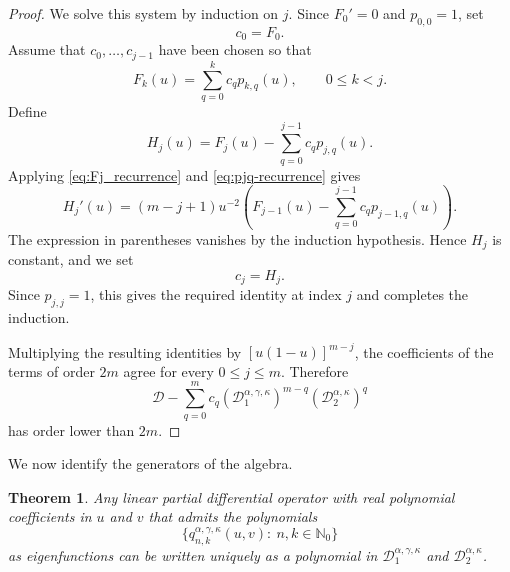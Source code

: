 \documentclass[reqno,10pt]{amsart}
\theoremstyle{plain}
\newtheorem{theorem}{Theorem}[section]
\numberwithin{equation}{section}
\numberwithin{figure}{section}
\begin{document}
\begin{proof}
We solve this system by induction on \(j\). Since \(F_0'=0\) and
\(p_{0,0}=1\), set
\[
c_0=F_0.
\]
Assume that \(c_0,\ldots,c_{j-1}\) have been chosen so that
\[
F_k(u)
=
\sum_{q=0}^{k}c_qp_{k,q}(u),
\qquad 0\le k<j.
\]
Define
\[
H_j(u)
=
F_j(u)
-
\sum_{q=0}^{j-1}c_qp_{j,q}(u).
\]
Applying \eqref{eq:Fj_recurrence} and \eqref{eq:pjq-recurrence} gives
\[
H_j'(u)
=
(m-j+1)u^{-2}
\left(
F_{j-1}(u)
-
\sum_{q=0}^{j-1}c_qp_{j-1,q}(u)
\right).
\]
The expression in parentheses vanishes by the induction hypothesis.
Hence \(H_j\) is constant, and we set
\[
c_j=H_j.
\]
Since \(p_{j,j}=1\), this gives the required identity at index \(j\) and
completes the induction.

Multiplying the resulting identities by \([u(1-u)]^{m-j}\), the
coefficients of the terms of order \(2m\) agree for every
\(0\leq j\leq m\). Therefore
\[
\mathcal D
-
\sum_{q=0}^{m}
c_q
\left(\mathcal D_1^{\alpha,\gamma,\kappa}\right)^{m-q}
\left(\mathcal D_2^{\alpha,\kappa}\right)^q
\]
has order lower than \(2m\).
\end{proof}


We now identify the generators of the algebra.

\begin{theorem}\label{thm:algebra_agk}
Any linear partial differential operator with real polynomial coefficients in
$u$ and $v$ that admits the polynomials
\[
\{q_{n,k}^{\alpha,\gamma,\kappa}(u,v):\ n,k\in\mathbb{N}_0\}
\]
as eigenfunctions can be written uniquely as a polynomial in
$\mathcal{D}_{1}^{\alpha,\gamma,\kappa}$ and
$\mathcal{D}_{2}^{\alpha,\kappa}$.
\end{theorem}
\end{document}
